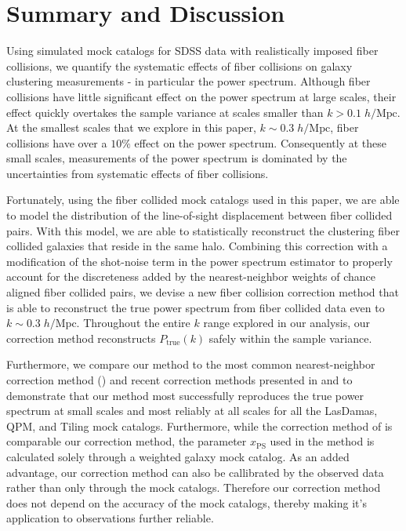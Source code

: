 \documentclass{emulateapj}
\begin{document}
\section{Summary and Discussion} \label{sec:summary}
Using simulated mock catalogs for SDSS data with realistically imposed fiber collisions, we quantify the systematic effects of fiber collisions on galaxy clustering measurements - in particular the power spectrum. Although fiber collisions have little significant effect on the power spectrum at large scales, their effect quickly overtakes the sample variance at scales smaller than $k > 0.1 \;h/\mathrm{Mpc}$. At the smallest scales that we explore in this paper, $k \sim 0.3  \;h/\mathrm{Mpc}$, fiber collisions have over a $10 \%$ effect on the power spectrum. Consequently at these small scales, measurements of the power spectrum is dominated by the uncertainties from systematic effects of fiber collisions. 

Fortunately, using the fiber collided mock catalogs used in this paper, we are able to model the distribution of the line-of-sight displacement between fiber collided pairs. With this model, we are able to statistically reconstruct the clustering fiber collided galaxies that reside in the same halo. Combining this correction with a modification of the shot-noise term in the power spectrum estimator to properly account for the discreteness added by the nearest-neighbor weights of chance aligned fiber collided pairs, we devise a new fiber collision correction method that is able to reconstruct the true power spectrum from fiber collided data even to $k \sim 0.3 \;h/\mathrm{Mpc}$. Throughout the entire $k$ range explored in our analysis, our correction method reconstructs $P_\mathrm{true}(k)$ safely within the sample variance. 

Furthermore, we compare our method to the most common nearest-neighbor correction method (\citealt{Zehavi:2002aa, Berlind:2006aa, Anderson:2012aa}) and recent correction methods presented in \cite{Beutler:2014aa} and \cite{Gil-Marin:2014aa} to demonstrate that our method most successfully reproduces the true power spectrum at small scales and most reliably at all scales for all the LasDamas, QPM, and Tiling mock catalogs. Furthermore, while the correction method of \cite{Gil-Marin:2014aa} is comparable our correction method, the parameter $x_\mathrm{PS}$ used in the method is calculated solely through a weighted galaxy mock catalog. As an added advantage, our correction method can also be callibrated by the observed data rather than only through the mock catalogs. Therefore our correction method does not depend on the accuracy of the mock catalogs, thereby making it's application to observations further reliable. 
\end{document}

